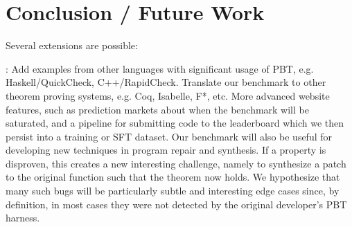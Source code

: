 \section{Conclusion / Future Work}
Several extensions are possible:

\TODO: Add examples from other languages with significant usage of PBT, e.g. Haskell/QuickCheck, C++/RapidCheck.
Translate our benchmark to other theorem proving systems, e.g. Coq, Isabelle, F*, etc.
More advanced website features, such as prediction markets about when the benchmark will be saturated, and a pipeline for submitting code to the leaderboard which we then persist into a training or SFT dataset.
Our benchmark will also be useful for developing new techniques in program repair and synthesis. If a property is disproven, this creates a new interesting challenge, namely to synthesize a patch to the original function such that the theorem now holds. We hypothesize that many such bugs will be particularly subtle and interesting edge cases since, by definition, in most cases they were not detected by the original developer's PBT harness.
